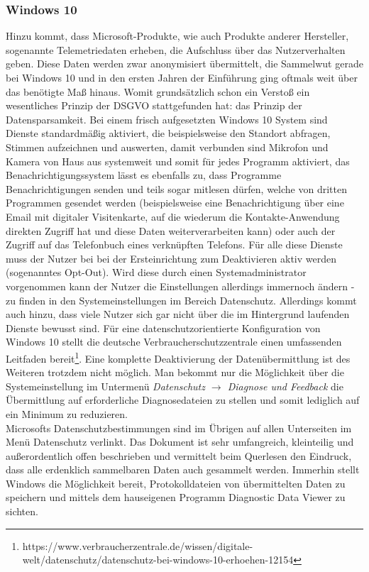 \subsubsection{Windows 10}
Hinzu kommt, dass Microsoft-Produkte, wie auch Produkte anderer Hersteller, sogenannte Telemetriedaten erheben, die Aufschluss über das Nutzerverhalten geben. Diese Daten werden zwar anonymisiert übermittelt, die Sammelwut gerade bei Windows 10 und in den ersten Jahren der Einführung ging oftmals weit über das benötigte Maß hinaus. Womit grundsätzlich schon ein Verstoß ein wesentliches Prinzip der DSGVO stattgefunden hat: das Prinzip der Datensparsamkeit. Bei einem frisch aufgesetzten Windows 10 System sind Dienste standardmäßig aktiviert, die beispielsweise den Standort abfragen, Stimmen aufzeichnen und auswerten, damit verbunden sind Mikrofon und Kamera von Haus aus systemweit und somit für jedes Programm aktiviert, das Benachrichtigungssystem lässt es ebenfalls zu, dass Programme Benachrichtigungen senden und teils sogar mitlesen dürfen,
welche von dritten Programmen gesendet werden (beispielsweise eine Benachrichtigung über eine Email mit digitaler Visitenkarte, auf die wiederum die Kontakte-Anwendung direkten Zugriff hat und diese Daten weiterverarbeiten kann) oder auch der Zugriff auf das Telefonbuch eines verknüpften Telefons. Für alle diese Dienste muss der Nutzer bei bei der Ersteinrichtung zum Deaktivieren aktiv werden (sogenanntes Opt-Out). Wird diese durch einen Systemadministrator vorgenommen kann der Nutzer die Einstellungen allerdings immernoch ändern - zu finden in den Systemeinstellungen im Bereich \glqq Datenschutz\grqq{}. Allerdings kommt auch hinzu, dass viele Nutzer sich gar nicht über die im Hintergrund laufenden Dienste bewusst sind. Für eine datenschutzorientierte Konfiguration von Windows 10 stellt die deutsche Verbraucherschutzzentrale einen umfassenden Leitfaden bereit\footnote{https://www.verbraucherzentrale.de/wissen/digitale-welt/datenschutz/datenschutz-bei-windows-10-erhoehen-12154}. Eine komplette Deaktivierung der Datenübermittlung ist des Weiteren trotzdem nicht möglich. Man bekommt nur die Möglichkeit über die Systemeinstellung im Untermenü \textit{Datenschutz $\rightarrow$ Diagnose und Feedback} die Übermittlung auf \glqq erforderliche Diagnosedateien\grqq{} zu stellen und somit lediglich auf ein Minimum zu reduzieren.\\
Microsofts Datenschutzbestimmungen sind im Übrigen auf allen Unterseiten im Menü \glqq Datenschutz\grqq{} verlinkt. Das Dokument ist sehr umfangreich, kleinteilig und außerordentlich offen beschrieben und vermittelt beim Querlesen den Eindruck, dass alle erdenklich sammelbaren Daten auch gesammelt werden. Immerhin stellt Windows die Möglichkeit bereit, Protokolldateien von übermittelten Daten zu speichern und mittels dem hauseigenen Programm \glqq Diagnostic Data Viewer\grqq{} zu sichten.\\

